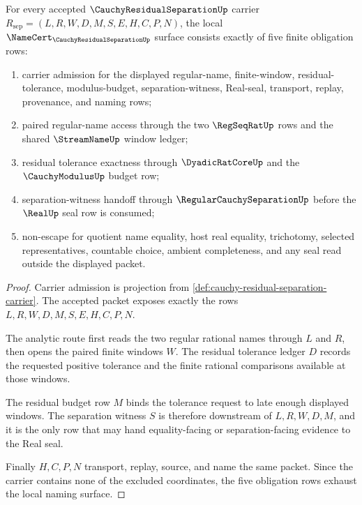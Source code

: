 \begin{theorem}
\label{thm:cauchy-residual-separation-namecert-obligations}
For every accepted $\CauchyResidualSeparationUp$ carrier $R_{\mathrm{sep}}=(L,R,W,D,M,S,E,H,C,P,N)$, the local $\NameCert_{\CauchyResidualSeparationUp}$ surface consists exactly of five finite obligation rows:
\begin{enumerate}
\item carrier admission for the displayed regular-name, finite-window, residual-tolerance, modulus-budget, separation-witness, Real-seal, transport, replay, provenance, and naming rows;
\item paired regular-name access through the two $\RegSeqRatUp$ rows and the shared $\StreamNameUp$ window ledger;
\item residual tolerance exactness through $\DyadicRatCoreUp$ and the $\CauchyModulusUp$ budget row;
\item separation-witness handoff through $\RegularCauchySeparationUp$ before the $\RealUp$ seal row is consumed;
\item non-escape for quotient name equality, host real equality, trichotomy, selected representatives, countable choice, ambient completeness, and any seal read outside the displayed packet.
\end{enumerate}
\end{theorem}
\begin{proof}
Carrier admission is projection from \autoref{def:cauchy-residual-separation-carrier}. The accepted packet exposes exactly the rows $L,R,W,D,M,S,E,H,C,P,N$.

The analytic route first reads the two regular rational names through $L$ and $R$, then opens the paired finite windows $W$. The residual tolerance ledger $D$ records the requested positive tolerance and the finite rational comparisons available at those windows.

The residual budget row $M$ binds the tolerance request to late enough displayed windows. The separation witness $S$ is therefore downstream of $L,R,W,D,M$, and it is the only row that may hand equality-facing or separation-facing evidence to the Real seal.

Finally $H,C,P,N$ transport, replay, source, and name the same packet. Since the carrier contains none of the excluded coordinates, the five obligation rows exhaust the local naming surface.
\end{proof}



